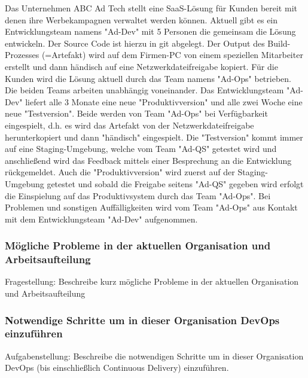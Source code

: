 Das Unternehmen ABC Ad Tech stellt eine SaaS-Lösung für Kunden bereit mit denen ihre
Werbekampagnen verwaltet werden können.
Aktuell gibt es ein Entwicklungsteam namens "Ad-Dev" mit 5 Personen die gemeinsam die
Lösung entwickeln. Der Source Code ist hierzu in git abgelegt. Der Output des Build-Prozesses
(=Artefakt) wird auf dem Firmen-PC von einem speziellen Mitarbeiter erstellt und dann
händisch auf eine Netzwerkdateifreigabe kopiert.
Für die Kunden wird die Lösung aktuell durch das Team namens "Ad-Ops" betrieben.
Die beiden Teams arbeiten unabhängig voneinander.
Das Entwicklungsteam "Ad-Dev" liefert alle 3 Monate eine neue "Produktivversion" und alle
zwei Woche eine neue "Testversion". Beide werden von Team "Ad-Ops" bei Verfügbarkeit
eingespielt, d.h. es wird das Artefakt von der Netzwerkdateifreigabe herunterkopiert und dann
"händisch" eingespielt. Die "Testversion" kommt immer auf eine Staging-Umgebung, welche
vom Team "Ad-QS" getestet wird und anschließend wird das Feedback mittels einer
Besprechung an die Entwicklung rückgemeldet. Auch die "Produktivversion" wird zuerst auf der
Staging-Umgebung getestet und sobald die Freigabe seitens "Ad-QS" gegeben wird erfolgt die
Einspielung auf das Produktivsystem durch das Team "Ad-Ops". Bei Problemen und sonstigen
Auffälligkeiten wird vom Team "Ad-Ops" aus Kontakt mit dem Entwicklungsteam "Ad-Dev"
aufgenommen.\\


\subsubsection{Mögliche Probleme in der aktuellen Organisation und Arbeitsaufteilung}

Fragestellung: Beschreibe kurz mögliche Probleme in der aktuellen Organisation und Arbeitsaufteilung
    

\subsubsection{Notwendige Schritte um in dieser Organisation DevOps einzuführen}
Aufgabenstellung: Beschreibe die notwendigen Schritte um in dieser Organisation DevOps (bis einschließlich
Continuous Delivery) einzuführen.

